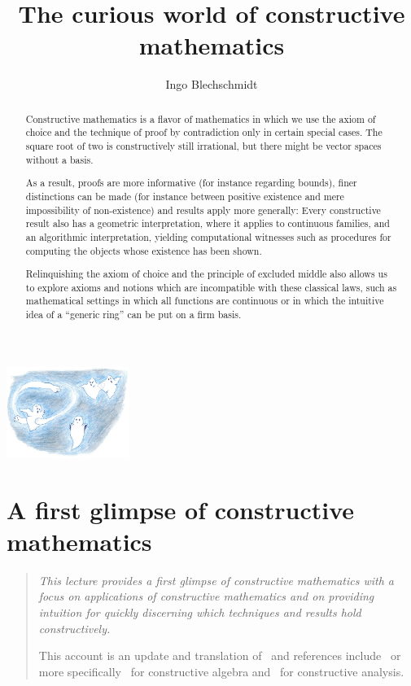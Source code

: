 \documentclass[10pt,reqno,a4paper,openany]{amsbook}
\title{The curious world of constructive mathematics}
\author{Ingo Blechschmidt \vspace*{-2em}}
\theoremstyle{definition}
\theoremstyle{plain}
\theoremstyle{remark}
\newcommand{\?}{\,{:}\,}
\renewcommand{\_}{\mathpunct{.}\,}
\newenvironment{intro}{\begin{quote}}{\end{quote}\bigskip}
\begin{document}
\begin{abstract}
Constructive mathematics is a flavor of mathematics in which we use the
axiom of choice and the technique of proof by contradiction only in
certain special cases. The square root of two is constructively still
irrational, but there might be vector spaces without a basis.

As a result, proofs are more informative (for instance regarding
bounds), finer distinctions can be made (for instance between positive
existence and mere impossibility of non-existence) and results apply
more generally: Every constructive result also has a geometric
interpretation, where it applies to continuous families, and an
algorithmic interpretation, yielding computational witnesses such as
procedures for computing the objects whose existence has been shown.

Relinquishing the axiom of choice and the principle of excluded middle also
allows us to explore axioms and notions which are incompatible with
these classical laws, such as mathematical settings in which all
functions are continuous or in which the intuitive idea of a ``generic
ring'' can be put on a firm basis.
\end{abstract}

{
\renewcommand{\newpage}{\ }
\renewcommand{\vfill}{\ }
\renewcommand{\vfil}{\ }
\enlargethispage{7em}
{\vspace*{-6em}\centering\includegraphics[width=0.3\textwidth]{phantoms}\par}
\maketitle
}

\setcounter{tocdepth}{1}
{
\renewcommand{\newpage}{\ }
\tableofcontents
}
\thispagestyle{empty}


\chapter{A first glimpse of constructive mathematics}

\begin{intro}
\it
This lecture provides a first glimpse of constructive mathematics with a
focus on applications of constructive mathematics and on providing
intuition for quickly discerning which techniques and results hold
constructively.

This account is an update and translation of~\cite[Section~1]{blechschmidt:pizzaseminar}
and references
include~\cite{bauer:five-stages-video,bauer:five-stages-article,avigad:constructive,sep:intuitionistic-logic,dummett:basis,melikhov:intuitionistic-logic,streicher:constructive}
or more
specifically~\cite{mines-richman-ruitenburg:constructive-algebra,lombardi-quitte:constructive-algebra}
for constructive algebra and~\cite{bishop-bridges:bible} for constructive
analysis.
\end{intro}
\end{document}
